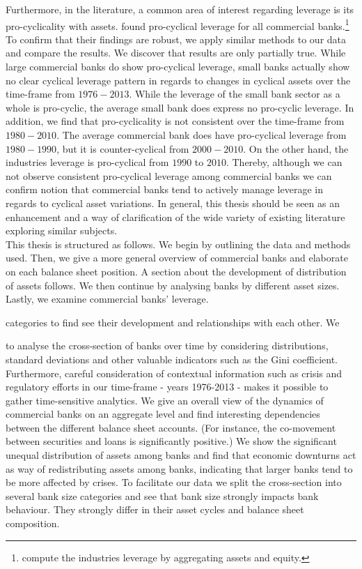 \documentclass[12pt, a4paper]{article} %
\begin{document}
Furthermore, in the literature, a common area of interest regarding leverage is its pro-cyclicality with assets. \citet{AdrianShin2011} found pro-cyclical leverage for all commercial banks.\footnote{\citet{AdrianShin2011} compute the industries leverage by aggregating assets and equity.} To confirm that their findings are robust, we apply similar methods to our data and compare the results. We discover that \citet{AdrianShin2011} results are only partially true. While large commercial banks do show pro-cyclical leverage, small banks actually show no clear cyclical leverage pattern in regards to changes in cyclical assets over the time-frame from $1976-2013$. While the leverage of the small bank sector as a whole is pro-cyclic, the average small bank does express no pro-cyclic leverage. 
In addition, we find that pro-cyclicality is not consistent over the time-frame from $1980-2010$. The average commercial bank does have pro-cyclical leverage from $1980-1990$, but it is counter-cyclical from $2000-2010$. On the other hand, the industries leverage is pro-cyclical from $1990$ to $2010$. 
Thereby, although we can not observe consistent pro-cyclical leverage among commercial banks we can confirm \citet{AdrianShin2011} notion that commercial banks tend to actively manage leverage in regards to cyclical asset variations.
In general, this thesis should be seen as an enhancement and a way of clarification of the wide variety of existing literature exploring similar subjects. \\
This thesis is structured as follows. We begin by outlining the data and methods used. Then, we give a more general overview of commercial banks and elaborate on each balance sheet position. A section about the development of distribution of assets follows. We then continue by analysing banks by different asset sizes. Lastly, we examine commercial banks' leverage.

\iffalse
 categories to find see their development and relationships with each other. 
We 

to analyse the cross-section of banks over time by considering distributions, standard deviations and other valuable indicators such as the Gini coefficient. Furthermore, careful consideration of contextual information such as crisis and regulatory efforts in our time-frame - years 1976-2013 - makes it possible to gather time-sensitive analytics.
We give an overall view of the dynamics of commercial banks on an aggregate level and find interesting dependencies between the different balance sheet accounts. (For instance, the co-movement between securities and loans is significantly positive.)
We show the significant unequal distribution of assets among banks and find that economic downturns act as way of redistributing assets among banks, indicating that larger banks tend to be more affected by crises.
To facilitate our data we split the cross-section into several bank size categories and see that bank size strongly impacts bank behaviour. They strongly differ in their asset cycles and balance sheet composition.  
\end{document}
